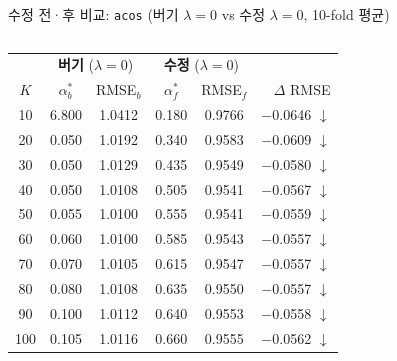 \documentclass[aspectratio=169,10pt]{beamer}
\begin{document}
\begin{frame}[shrink=20]{수정 전·후 비교: \texttt{acos} \textnormal{\small(버기 $\lambda=0$ vs 수정 $\lambda=0$, 10-fold 평균)}}
	\begin{columns}[T]
		\begin{center}
		\renewcommand{\arraystretch}{1.15}
		\small
		\begin{tabular}{c|cc|cc|r}
			\toprule
			& \multicolumn{2}{c|}{\textbf{버기} ($\lambda=0$)} & \multicolumn{2}{c|}{\textbf{수정} ($\lambda=0$)} & \\
			$K$ & $\alpha^*_b$ & RMSE$_b$ & $\alpha^*_f$ & RMSE$_f$ & $\Delta$ RMSE \\
			\midrule
			\rowcolor{negred!15}
			10  & 6.800 & 1.0412 & 0.180 & 0.9766 & \textcolor{testgreen}{$-$0.0646 $\downarrow$} \\
			20  & 0.050 & 1.0192 & 0.340 & 0.9583 & \textcolor{testgreen}{$-$0.0609 $\downarrow$} \\
			30  & 0.050 & 1.0129 & 0.435 & 0.9549 & \textcolor{testgreen}{$-$0.0580 $\downarrow$} \\
			40  & 0.050 & 1.0108 & 0.505 & 0.9541 & \textcolor{testgreen}{$-$0.0567 $\downarrow$} \\
			50  & 0.055 & 1.0100 & 0.555 & 0.9541 & \textcolor{testgreen}{$-$0.0559 $\downarrow$} \\
			60  & 0.060 & 1.0100 & 0.585 & 0.9543 & \textcolor{testgreen}{$-$0.0557 $\downarrow$} \\
			70  & 0.070 & 1.0105 & 0.615 & 0.9547 & \textcolor{testgreen}{$-$0.0557 $\downarrow$} \\
			80  & 0.080 & 1.0108 & 0.635 & 0.9550 & \textcolor{testgreen}{$-$0.0557 $\downarrow$} \\
			90  & 0.100 & 1.0112 & 0.640 & 0.9553 & \textcolor{testgreen}{$-$0.0558 $\downarrow$} \\
			100 & 0.105 & 1.0116 & 0.660 & 0.9555 & \textcolor{testgreen}{$-$0.0562 $\downarrow$} \\
			\bottomrule
		\end{tabular}
		\end{center}


\end{columns}
\end{frame}
\end{document}
